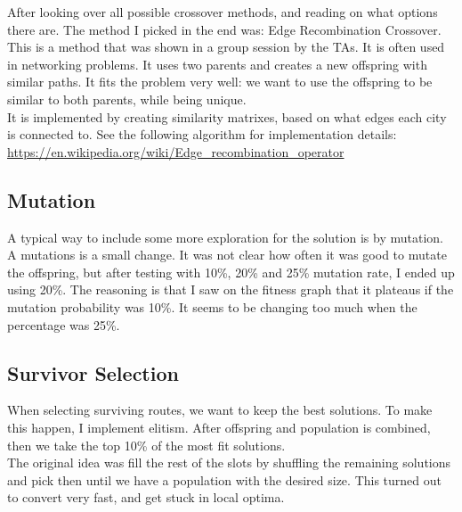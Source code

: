 \documentclass{article}
\begin{document}
    After looking over all possible crossover methods, and reading on what options there are. The method I picked in the end was: Edge Recombination Crossover. 
    This is a method that was shown in a group session by the TAs. It is often used in networking problems. It uses two parents and creates a new offspring with similar paths. 
    It fits the problem very well: we want to use the offspring to be similar to both parents, while being unique. \\

    It is implemented by creating similarity matrixes, based on what edges each city is connected to. 
    See the following algorithm for implementation details: \url{https://en.wikipedia.org/wiki/Edge_recombination_operator}
    

    \subsection{Mutation}

    A typical way to include some more exploration for the solution is by mutation. A mutations is a small change. 
    It was not clear how often it was good to mutate the offspring, but after testing with 10\%, 20\% and 25\% mutation rate, I ended up using 20\%. 
    The reasoning is that I saw on the fitness graph that it plateaus if the mutation probability was 10\%. It seems to be changing too much when the percentage was 25\%. 

    \subsection{Survivor Selection}

    When selecting surviving routes, we want to keep the best solutions. To make this happen, I implement elitism. 
    After offspring and population is combined, then we take the top 10\% of the most fit solutions. \\
    
    
    The original idea was fill the rest of the slots by shuffling the remaining solutions and pick then until we have a population with the desired size.
    This turned out to convert very fast, and get stuck in local optima. \\
\end{document}
